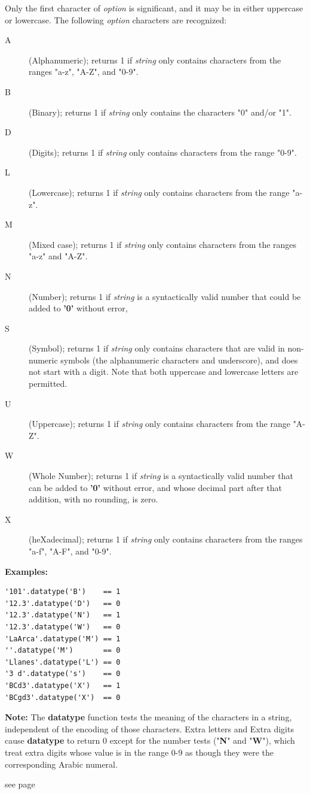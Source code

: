 \begin{description}
Only the first character of \emph{option} is significant, and it may
be in either uppercase or lowercase.
The following \emph{option} characters are recognized:
\begin{description}
\item[A]\label{refdta}
(Alphanumeric); returns 1 if \emph{string} only contains
characters from the ranges "a-z", "A-Z", and "0-9".
\item[B]\label{refdtb}
(Binary); returns 1 if \emph{string} only contains the
characters "0" and/or "1".
\item[D]\label{refdtd}
(Digits); returns 1 if \emph{string} only contains
characters from the range "0-9".
\item[L]\label{refdtl}
(Lowercase); returns 1 if \emph{string} only contains
characters from the range "a-z".
\item[M]\label{refdtm}
(Mixed case); returns 1 if \emph{string} only contains
characters from the ranges "a-z" and "A-Z".
\item[N]\label{refdtn}
(Number); returns 1 if \emph{string} is a syntactically valid
\crexx{} number that could be added to \textbf{'0'} without error,
\item[S]\label{refdts}
(Symbol); returns 1 if \emph{string} only contains characters
that are valid in non-numeric symbols (the alphanumeric characters and
underscore), and does not start with a digit.  Note that both uppercase
and lowercase letters are permitted.
\item[U]\label{refdtu}
(Uppercase); returns 1 if \emph{string} only contains
characters from the range "A-Z".
\item[W]\label{refdtw}
(Whole Number); returns 1 if \emph{string} is a syntactically valid
\crexx{} number that can be added to \textbf{'0'} without error, and
whose decimal part after that addition, with no rounding, is zero.
\item[X]\label{refdtx}
(heXadecimal); returns 1 if \emph{string} only contains
characters from the ranges "a-f", "A-F", and "0-9".
\end{description}
 
\textbf{Examples:}
\begin{lstlisting}
'101'.datatype('B')    == 1
'12.3'.datatype('D')   == 0
'12.3'.datatype('N')   == 1
'12.3'.datatype('W')   == 0
'LaArca'.datatype('M') == 1
''.datatype('M')       == 0
'Llanes'.datatype('L') == 0
'3 d'.datatype('s')    == 0
'BCd3'.datatype('X')   == 1
'BCgd3'.datatype('X')  == 0
\end{lstlisting}
\textbf{Note: }The \textbf{datatype} function tests the meaning of the characters
in a string, independent of the encoding of those characters.  Extra
letters and Extra digits cause \textbf{datatype} to return 0 except
for the number tests ("\textbf{N}" and "\textbf{W}"),
which treat extra digits whose value is in the range 0-9 as though they
were the corresponding Arabic numeral.
\item[date()] see page \pageref{refrexxdate}
\item[delstr(n [,length{]})]\label{refdelstr}


\end{description}

